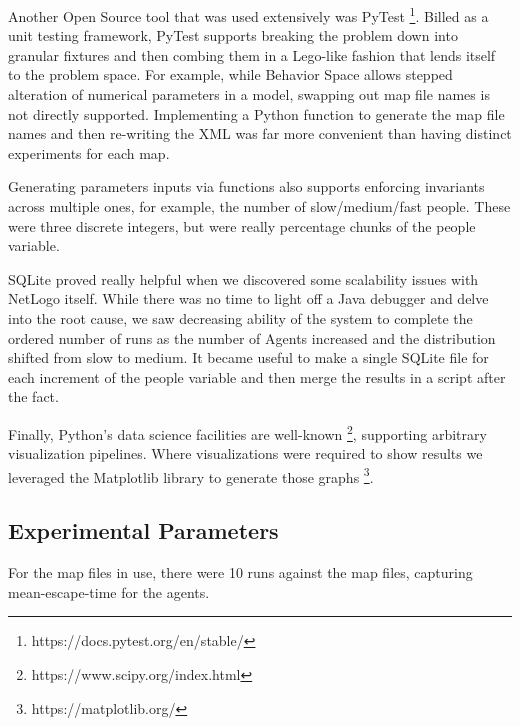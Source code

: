 \documentclass[12pt,letterpaper]{article}
\begin{document}
Another Open Source tool that was used extensively was PyTest \footnote{https://docs.pytest.org/en/stable/}. Billed as a
unit testing framework, PyTest supports breaking the problem down into granular
fixtures and then combing them in a Lego-like fashion that lends itself to the
problem space. For example, while Behavior Space allows stepped alteration of
numerical parameters in a model, swapping out map file names is not directly
supported. Implementing a Python function to generate the map file names and
then re-writing the XML was far more convenient than having distinct
experiments for each map.

Generating parameters inputs via functions also supports enforcing invariants
across multiple ones, for example, the number of slow/medium/fast people. These
were three discrete integers, but were really percentage chunks of the people
variable.

SQLite proved really helpful when we discovered some scalability issues with
NetLogo itself. While there was no time to light off a Java debugger and delve
into the root cause, we saw decreasing ability of the system to complete the
ordered number of runs as the number of Agents increased and the distribution
shifted from slow to medium. It became useful to make a single SQLite file for
each increment of the people variable and then merge the results in a script
after the fact.

Finally, Python's data science facilities are well-known \footnote{https://www.scipy.org/index.html}, supporting arbitrary visualization pipelines.  Where visualizations were required to show results we leveraged the Matplotlib library to generate those graphs \footnote{ https://matplotlib.org/}.

\subsection{Experimental Parameters}
For the map files in use, there were 10 runs against the map files, capturing
mean-escape-time for the agents.
\end{document}
